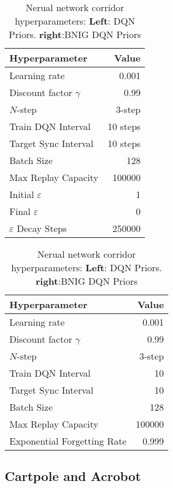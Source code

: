 {{\begin{table}[H]
    \centering
    \begin{tabular}{@{}lr@{}}
        \toprule
        Hyperparameter               & Value \\ \midrule
        Learning rate                & 0.001 \\
        Discount factor $\gamma$     & 0.99  \\
        $N$-step                     & 3-step \\
        Train DQN Interval           & 10 steps \\
        Target Sync Interval         & 10 steps \\
        Batch Size                   & 128 \\
        Max Replay Capacity          & 100000 \\ 
        Initial $\varepsilon$        & 1 \\
        Final $\varepsilon$          & 0 \\
        $\varepsilon$ Decay Steps    & 250000 \\ \bottomrule
    \end{tabular}
    \quad
    \begin{tabular}{@{}lr@{}}
        \toprule
        Hyperparameter               & Value \\ \midrule
        Learning rate                & 0.001 \\
        Discount factor $\gamma$     & 0.99  \\
        $N$-step                     & 3-step \\
        Train DQN Interval           & 10 \\
        Target Sync Interval         & 10\\
        Batch Size                   & 128 \\
        Max Replay Capacity          & 100000 \\
        Exponential Forgetting Rate  & 0.999 \\ \bottomrule
    \end{tabular}
    \caption{Nerual network corridor hyperparameters: \textbf{Left}: DQN Priors. \textbf{right}:BNIG DQN Priors}
\end{table}

\subsection{Cartpole and Acrobot}

}}
